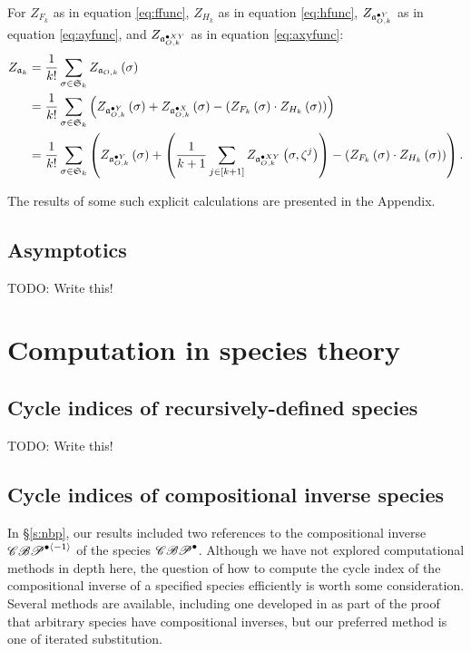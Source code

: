 \documentclass[sectionflow,singlespace,twoside,boldmathhdr]{brandiss} %
\numberwithin{section}{chapter}
\numberwithin{figure}{chapter}
\begin{document}
\begin{theorem}
  \label{thm:ktreecyc}
  For $Z_{F_{k}}$ as in equation \eqref{eq:ffunc}, $Z_{H_{k}}$ as in equation \eqref{eq:hfunc}, $Z_{\pointed[Y]{\mathfrak{a}}_{O, k}}$ as in equation \eqref{eq:ayfunc}, and $Z_{\pointed[XY]{\mathfrak{a}}_{O, k}}$ as in equation \eqref{eq:axyfunc}:
  \begin{subequations}
    \begin{align}
      Z_{\mathfrak{a}_{k}} &= \frac{1}{k!} \sum_{\sigma \in \mathfrak{S}_{k}} Z_{\mathfrak{a}_{O, k}} \pbrac{\sigma} \\
      &= \frac{1}{k!} \sum_{\sigma \in \mathfrak{S}_{k}} \pbrac{Z_{\pointed[Y]{\mathfrak{a}}_{O, k}} \pbrac{\sigma} + Z_{\pointed[X]{\mathfrak{a}}_{O, k}} \pbrac{\sigma} - \pbrac{Z_{F_{k}} \pbrac{\sigma} \cdot Z_{H_{k}} \pbrac{\sigma}}} \\
      &= \frac{1}{k!} \sum_{\sigma \in \mathfrak{S}_{k}}
      \pbrac{Z_{\pointed[Y]{\mathfrak{a}}_{O, k}} \pbrac{\sigma} +
        \pbrac{\frac{1}{k+1} \sum_{j \in \sbrac{k+1}}
          Z_{\pointed[XY]{\mathfrak{a}}_{O, k}} \pbrac{\sigma,
            \zeta^{j}}} - \pbrac{Z_{F_{k}} \pbrac{\sigma} \cdot
          Z_{H_{k}} \pbrac{\sigma}}}.
    \end{align}
  \end{subequations}

\end{theorem}

The results of some such explicit calculations are presented in the Appendix.

\section{Asymptotics}
TODO: Write this!

\appendix
\chapter{Computation in species theory}\label{c:comp}
\section{Cycle indices of recursively-defined species}\label{c:comprecurs}
TODO: Write this!

\section{Cycle indices of compositional inverse species}\label{s:compinv}
In \S \ref{s:nbp}, our results included two references to the compositional inverse $\specname{CBP}^{\bullet \abrac{-1}}$ of the species $\specname{CBP}^{\bullet}$.
Although we have not explored computational methods in depth here, the question of how to compute the cycle index of the compositional inverse of a specified species efficiently is worth some consideration.
Several methods are available, including one developed in \cite[4.2.19]{bll:species} as part of the proof that arbitrary species have compositional inverses, but our preferred method is one of iterated substitution.
\end{document}

